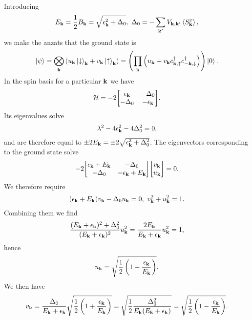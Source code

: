Introducing
\begin{align*}
	E_{\vb{k}} = \frac{1}{2}B_{\vb{k}} = \sqrt{\epsilon_{\vb{k}}^{2} + \Delta_{0}},\ \Delta_{0} = -\sum\limits_{\vb{k}^{\prime}}V_{\vb{k}, \vb{k}^{\prime}}\expval{S_{\vb{k}}^{x}},
\end{align*}
we make the anzats that the ground state is
\begin{align*}
	\ket{\psi} = \bigotimes\limits_{\vb{k}}\left(u_{\vb{k}}\ket{\downarrow}_{\vb{k}} + v_{\vb{k}}\ket{\uparrow}_{\vb{k}}\right) = \left(\prod\limits_{\vb{k}}\left(u_{\vb{k}} + v_{\vb{k}}c_{\vb{k}, \uparrow}^{\dagger} c_{-\vb{k}, \downarrow}^{\dagger}\right)\right)\ket{0}.
\end{align*}
In the spin basis for a particular $\vb{k}$ we have
\begin{align*}
	\ham = -2\mqty[
		\epsilon_{\vb{k}}  & -\Delta_{0} \\
		-\Delta_{0}        & -\epsilon_{\vb{k}}
	].
\end{align*}
Its eigenvalues solve
\begin{align*}
	\lambda^{2} - 4\epsilon_{\vb{k}}^{2} - 4\Delta_{0}^{2} = 0,
\end{align*}
and are therefore equal to $\pm 2E_{\vb{k}} = \pm 2\sqrt{\epsilon_{\vb{k}}^{2} + \Delta_{0}^{2}}$. The eigenvectors corresponding to the ground state solve
\begin{align*}
	-2\mqty[
		\epsilon_{\vb{k}} + E_{\vb{k}} & -\Delta_{0} \\
		-\Delta_{0}                    & -\epsilon_{\vb{k}} + E_{\vb{k}}
	]\mqty[
		v_{\vb{k}} \\
		u_{\vb{k}}
	] = 0.
\end{align*}
We therefore require
\begin{align*}
	(\epsilon_{\vb{k}} + E_{\vb{k}})v_{\vb{k}} - \Delta_{0}u_{\vb{k}} = 0,\ v_{\vb{k}}^{2} + u_{\vb{k}}^{2} = 1.
\end{align*}
Combining them we find
\begin{align*}
	\frac{(E_{\vb{k}} + \epsilon_{\vb{k}})^{2} + \Delta_{0}^{2}}{(E_{\vb{k}} + \epsilon_{\vb{k}})^{2}}u_{\vb{k}}^{2} = \frac{2E_{\vb{k}}}{E_{\vb{k}} + \epsilon_{\vb{k}}}u_{\vb{k}}^{2} = 1,
\end{align*}
hence
\begin{align*}
	u_{\vb{k}} = \sqrt{\frac{1}{2}\left(1 + \frac{\epsilon_{\vb{k}}}{E_{\vb{k}}}\right)}.
\end{align*}
We then have
\begin{align*}
	v_{\vb{k}} = \frac{\Delta_{0}}{E_{\vb{k}} + \epsilon_{\vb{k}}}\sqrt{\frac{1}{2}\left(1 + \frac{\epsilon_{\vb{k}}}{E_{\vb{k}}}\right)} = \sqrt{\frac{1}{2}\frac{\Delta_{0}^{2}}{E_{\vb{k}}(E_{\vb{k}} + \epsilon_{\vb{k}})}} = \sqrt{\frac{1}{2}\left(1 - \frac{\epsilon_{\vb{k}}}{E_{\vb{k}}}\right)}.
\end{align*}
